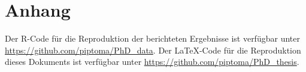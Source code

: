 \documentclass[11pt, twoside, a4paper]{book}		%
\begin{document}
\chapter[Anhang: Online-Material]{Anhang}

Der R-Code für die Reproduktion der berichteten Ergebnisse ist verfügbar unter \url{https://github.com/piptoma/PhD_data}.
Der \LaTeX-Code für die Reproduktion dieses Dokuments ist verfügbar unter \url{https://github.com/piptoma/PhD_thesis}.


\end{document}
